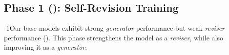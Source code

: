 



\subsection{Phase 1 (\sft{}): Self-Revision Training} \label{sec:phase1}

\looseness-1Our base models exhibit strong \textit{generator} performance but weak \textit{reviser} performance (). This phase strengthens the model as a \textit{reviser}, while also improving it as a \textit{generator}.


